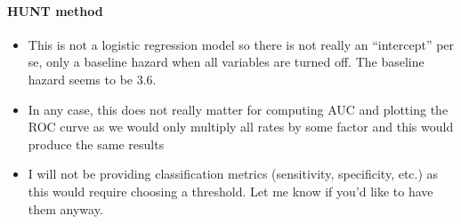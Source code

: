 \documentclass[12pt]{article}
\begin{document}
\paragraph*{HUNT method}
\begin{itemize}
	\item This is not a logistic regression model so there is not
	really an ``intercept'' per se, only a baseline hazard when
	all variables are turned off. The baseline hazard seems to be 3.6.
	\item In any case, this does not really matter for computing
	AUC and plotting the ROC curve as we would only multiply all
	rates by some factor and this would produce the same results
	\item I will not be providing classification metrics 
	(sensitivity, specificity, etc.) as this would require choosing 
	a threshold. Let me know if you'd like to have them anyway.
\end{itemize}
\end{document}

